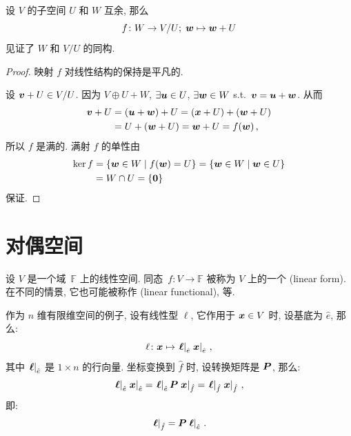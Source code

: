 \documentclass[openany, a5paper, oneside]{ctexbook}
\newcommand*{\inbasis}[2]{\left.%
	{#1}\right|_{#2}
}
\begin{document}
\begin{theorem}
	设 $V$ 的子空间 $U$ 和 $W$ 互余, 那么
	\begin{equation*}
		f \colon W \to V / U; \; \boldsymbol{w} \mapsto \boldsymbol{w} + U
	\end{equation*}
	见证了 $W$ 和 $V / U$ 的同构.
\end{theorem}
\begin{proof}
	映射 $f$ 对线性结构的保持是平凡的. 
	
	设 $\boldsymbol{v} + U \in V / U$.
	因为 $V \oplus U + W$, $\exists \boldsymbol{u} \in U$, $\exists \boldsymbol{w} \in W$ s.t.\ $\boldsymbol{v} = \boldsymbol{u} + \boldsymbol{w}$. 从而
	\begin{align*}
		\boldsymbol{v} + U 
		&= (\boldsymbol{u} + \boldsymbol{w}) + U
		= (\boldsymbol{x} + U) + (\boldsymbol{w} + U)
		\\
		&= U + (\boldsymbol{w} + U)
		= \boldsymbol{w} + U
		= f(\boldsymbol{w})\,, 
	\end{align*}
	所以 $f$ 是满的. 满射 $f$ 的单性由
	\begin{align*}
		\ker f &= \{\boldsymbol{w} \in W \mid f(\boldsymbol{w}) = U\} 
		= \{\boldsymbol{w} \in W \mid \boldsymbol{w} \in U\}
		\\
		&= W \cap U
		= \{\boldsymbol{0}\} 
	\end{align*}
	保证.
\end{proof}

\section{对偶空间}
\begin{definition}[线性型]
	设 $V$ 是一个域~$\mathbb F$ 上的线性空间.
	同态~$f \colon V \to \mathbb F$ 被称为 $V$ 上的一个 (linear form). 
	在不同的情景, 它也可能被称作 (linear functional), 等.
\end{definition}

作为 $n$ 维有限维空间的例子, 设有线性型 $\ell$, 它作用于 $\boldsymbol{x} \in V$ 时, 设基底为 $\hat e$, 那么:
\begin{equation*}
	\ell \colon \bv x \mapsto \inbasis{\bv \ell}{\hat e} \inbasis{\bv x}{\hat e}\,,
\end{equation*}
其中 $\inbasis{\bv \ell}{\hat e}$ 是 $1 \times n$ 的行向量. 坐标变换到 $\hat f$ 时, 设转换矩阵是 $\boldsymbol{P}$, 那么:
\begin{equation*}
	\inbasis{\bv \ell}{\hat e} \inbasis{\bv x}{\hat e} 
	= \inbasis{\bv \ell}{\hat e} \bv P \inbasis{\bv x}{\hat f}
	= \inbasis{\bv \ell}{\hat f} \inbasis{\bv x}{\hat f}\,, 
\end{equation*}
即:
\begin{equation}
	\inbasis{\bv \ell}{\hat f} = \bv P \inbasis{\bv \ell}{\hat e}\,.
\end{equation}
\end{document}
